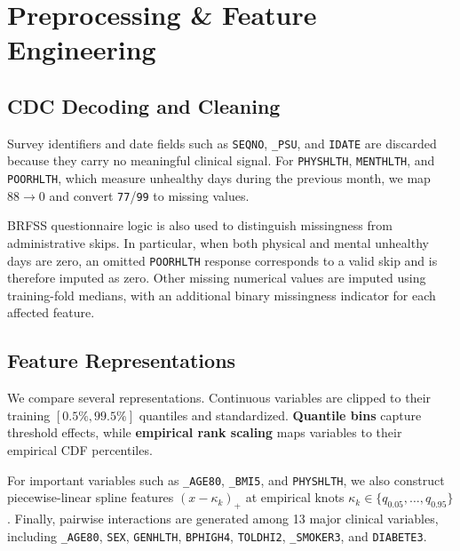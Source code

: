\documentclass[10pt,conference,compsocconf]{IEEEtran}
\begin{document}
\section{Preprocessing \& Feature Engineering}

\subsection{CDC Decoding and Cleaning}

Survey identifiers and date fields such as \texttt{SEQNO}, \texttt{\_PSU},
and \texttt{IDATE} are discarded because they carry no meaningful clinical
signal. For \texttt{PHYSHLTH}, \texttt{MENTHLTH}, and \texttt{POORHLTH},
which measure unhealthy days during the previous month, we map
$88\rightarrow0$ and convert \texttt{77}/\texttt{99} to missing values.

BRFSS questionnaire logic is also used to distinguish missingness from
administrative skips. In particular, when both physical and mental unhealthy
days are zero, an omitted \texttt{POORHLTH} response corresponds to a valid
skip and is therefore imputed as zero. Other missing numerical values are
imputed using training-fold medians, with an additional binary missingness
indicator for each affected feature.

\subsection{Feature Representations}

We compare several representations. Continuous variables are clipped to their
training $[0.5\%,99.5\%]$ quantiles and standardized. \textbf{Quantile bins}
capture threshold effects, while \textbf{empirical rank scaling} maps
variables to their empirical CDF percentiles.

For important variables such as \texttt{\_AGE80}, \texttt{\_BMI5}, and
\texttt{PHYSHLTH}, we also construct piecewise-linear spline features
$(x-\kappa_k)_+$ at empirical knots
$\kappa_k\in\{q_{0.05},\dots,q_{0.95}\}$. Finally, pairwise interactions are
generated among 13 major clinical variables, including \texttt{\_AGE80},
\texttt{SEX}, \texttt{GENHLTH}, \texttt{BPHIGH4}, \texttt{TOLDHI2},
\texttt{\_SMOKER3}, and \texttt{DIABETE3}.

\end{document}

